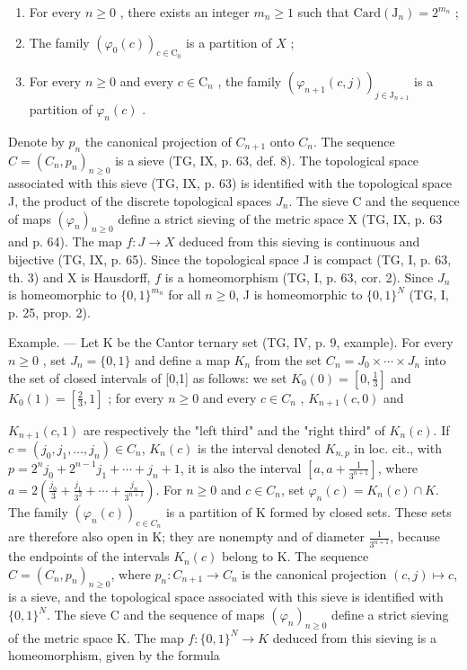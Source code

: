 \begin{enumerate}
\def\labelenumi{(\roman{enumi})}
\item
  For every \(n \geqslant 0\) , there exists an integer \(m_n \geqslant 1\) such that \(\mathrm{Card}(\mathrm{J}_n) = 2^{m_n}\) ;
\item
  The family \((\varphi_0(c))_{c\in \mathrm{C}_0}\) is a partition of \(X\) ;
\item
  For every \(n \geqslant 0\) and every \(c \in \mathrm{C}_n\) , the family \((\varphi_{n+1}(c,j))_{j \in \mathrm{J}_{n+1}}\) is a partition of \(\varphi_n(c)\) .
\end{enumerate}

Denote by \(p_n\) the canonical projection of \(C_{n+1}\) onto \(C_n\). The sequence \(C = (C_n, p_n)_{n \geqslant 0}\) is a sieve (TG, IX, p. 63, def. 8). The topological space associated with this sieve (TG, IX, p. 63) is identified with the topological space J, the product of the discrete topological spaces \(J_n\). The sieve C and the sequence of maps \((\varphi_n)_{n \geqslant 0}\) define a strict sieving of the metric space X (TG, IX, p. 63 and p. 64). The map \(f: J \to X\) deduced from this sieving is continuous and bijective (TG, IX, p. 65). Since the topological space J is compact (TG, I, p. 63, th. 3) and X is Hausdorff, \(f\) is a homeomorphism (TG, I, p. 63, cor. 2). Since \(J_n\) is homeomorphic to \(\{0, 1\}^{m_n}\) for all \(n \geqslant 0\), J is homeomorphic to \(\{0, 1\}^N\) (TG, I, p. 25, prop. 2).

Example. --- Let K be the Cantor ternary set (TG, IV, p. 9, example). For every \(n \geqslant 0\) , set \(J_{n} = \{0,1\}\) and define a map \(K_{n}\) from the set \(C_{n} = J_{0} \times \cdots \times J_{n}\) into the set of closed intervals of {[}0,1{]} as follows: we set \(K_{0}(0) = [0, \frac{1}{3}]\) and \(K_{0}(1) = [\frac{2}{3}, 1]\) ; for every \(n \geqslant 0\) and every \(c \in C_{n}\) , \(K_{n+1}(c,0)\) and

\(K_{n+1}(c,1)\) are respectively the "left third" and the "right third" of \(K_n(c)\). If \(c = (j_0,j_1,\ldots,j_n) \in C_n\), \(K_n(c)\) is the interval denoted \(K_{n,p}\) in loc. cit., with \(p = 2^n j_0 + 2^{n-1}j_1 + \cdots + j_n + 1\), it is also the interval \([a,a + \frac{1}{3^{n+1}}]\), where \(a = 2(\frac{j_0}{3} + \frac{j_1}{3^2} + \cdots + \frac{j_n}{3^{n+1}})\). For \(n \geqslant 0\) and \(c \in C_n\), set \(\varphi_n(c) = K_n(c) \cap K\). The family \((\varphi_n(c))_{c \in C_n}\) is a partition of K formed by closed sets. These sets are therefore also open in K; they are nonempty and of diameter \(\frac{1}{3^{n+1}}\), because the endpoints of the intervals \(K_n(c)\) belong to K. The sequence \(C = (C_n, p_n)_{n \geqslant 0}\), where \(p_n: C_{n+1} \to C_n\) is the canonical projection \((c,j) \mapsto c\), is a sieve, and the topological space associated with this sieve is identified with \(\{0,1\}^N\). The sieve C and the sequence of maps \((\varphi_n)_{n \geqslant 0}\) define a strict sieving of the metric space K. The map \(f: \{0,1\}^N \to K\) deduced from this sieving is a homeomorphism, given by the formula

